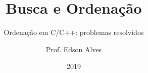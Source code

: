 \title{Busca e Ordenação}
\subtitle{Ordenação em C/C++: problemas resolvidos}
\date{2019}
\author{Prof. Edson Alves}
